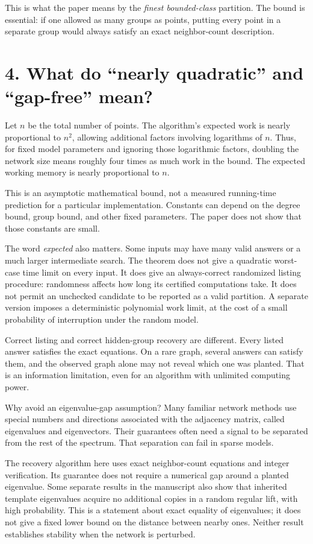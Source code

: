 \documentclass[11pt]{article}
\begin{document}
This is what the paper means by the \emph{finest bounded-class}
partition. The bound is essential: if one allowed as many groups as
points, putting every point in a separate group would always satisfy
an exact neighbor-count description.

\newpage
\section*{4. What do ``nearly quadratic'' and ``gap-free'' mean?}
Let $n$ be the total number of points. The algorithm's expected work
is nearly proportional to $n^2$, allowing additional factors involving
logarithms of $n$. Thus, for fixed model parameters and ignoring those
logarithmic factors, doubling the network size means roughly four
times as much work in the bound. The expected working memory is
nearly proportional to $n$.

This is an asymptotic mathematical bound, not a measured running-time
prediction for a particular implementation. Constants can depend on
the degree bound, group bound, and other fixed parameters. The paper
does not show that those constants are small.

The word \emph{expected} also matters. Some inputs may have many valid
answers or a much larger intermediate search. The theorem does not
give a quadratic worst-case time limit on every input. It does give
an always-correct randomized listing procedure: randomness affects
how long its certified computations take. It does not permit an
unchecked candidate to be reported as a valid partition. A separate
version imposes a deterministic polynomial work limit, at the cost of
a small probability of interruption under the random model.

Correct listing and correct hidden-group recovery are different.
Every listed answer satisfies the exact equations. On a rare graph,
several answers can satisfy them, and the observed graph alone may
not reveal which one was planted. That is an information limitation,
even for an algorithm with unlimited computing power.

Why avoid an eigenvalue-gap assumption? Many familiar network methods
use special numbers and directions associated with the adjacency
matrix, called eigenvalues and eigenvectors. Their guarantees often
need a signal to be separated from the rest of the spectrum. That
separation can fail in sparse models.

The recovery algorithm here uses exact neighbor-count equations and
integer verification. Its guarantee does not require a numerical gap
around a planted eigenvalue. Some separate results in the manuscript
also show that inherited template eigenvalues acquire no additional
copies in a random regular lift, with high probability. This is a
statement about exact equality of eigenvalues; it does not give a fixed
lower bound on the distance between nearby ones. Neither result
establishes stability when the network is perturbed.
\end{document}

